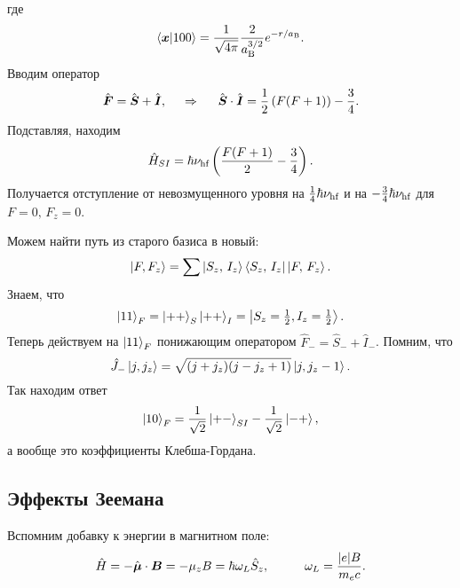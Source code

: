где 
\begin{equation*}
    \bk{\vc{x}}{100} = \frac{1}{\sqrt{4 \pi}} \frac{2}{\sub{a}{B}^{3/2}} e^{-r/\sub{a}{B}}.
\end{equation*}
Вводим оператор
\begin{equation*}
    \hat{\mbox{\boldmath $F$}} = \hat{\mbox{\boldmath $S$}} + \hat{\mbox{\boldmath $I$}},
    \hspace{0.5cm} \Rightarrow \hspace{0.5cm}
    \hat{\mbox{\boldmath $S$}} \cdot \hat{\mbox{\boldmath $I$}} = \frac{1}{2}\left(
        F(F+1)
    \right) - \frac{3}{4}.
\end{equation*}
Подставляя, находим
\begin{equation*}
    \hat{H}_{SI} = \hbar \nu_{\textnormal{hf}} \left(
        \frac{F(F+1)}{2} - \frac{3}{4}
    \right).
\end{equation*}
Получается отступление от невозмущенного уровня на $\frac{1}{4} \hbar \nu_{\textnormal{hf}}$  и на $- \frac{3}{4} \hbar\nu_{\textnormal{hf}}$ для $F=0,\, F_z = 0$. 

Можем найти путь из старого базиса в новый:
\begin{equation*}
    \left| F,F_z \right\rangle = \sum \left| S_z,\, I_z \right\rangle \left\langle S_z,\, I_z \right| \left| F,\, F_z \right\rangle.
\end{equation*}
Знаем, что
\begin{equation*}
    \left| 11 \right\rangle_F = \left| ++ \right\rangle_S \left| ++ \right\rangle_I = \left| S_z=\tfrac{1}{2}, I_z = \tfrac{1}{2} \right\rangle.
\end{equation*}
Теперь действуем на $\left| 11 \right\rangle_F$ понижающим оператором $\hat{F}_- = \hat{S}_- + \hat{I}_-$. Помним, что
\begin{equation*}
    \hat{J}_- \left| j, j_z \right\rangle = \sqrt{(j+j_z)(j-j_z+1)} \left| j, j_z-1 \right\rangle.
\end{equation*}
Так находим ответ
\begin{equation*}
    \left| 10 \right\rangle_F = \frac{1}{\sqrt{2}} \left| +- \right\rangle_{SI} - \frac{1}{\sqrt{2}} \left| -+ \right\rangle,
\end{equation*}
а вообще это коэффициенты Клебша-Гордана.



\subsection{Эффекты Зеемана}


Вспомним добавку к энергии в магнитном поле:
\begin{equation*}
    \hat{H} = - \hat{\vc{\mu}} \cdot \vc{B} = - \mu_z B = \hbar \omega_L \hat{S}_z,
    \hspace{10 mm} 
    \omega_L = \frac{|e| B}{m_e c}.
\end{equation*}


